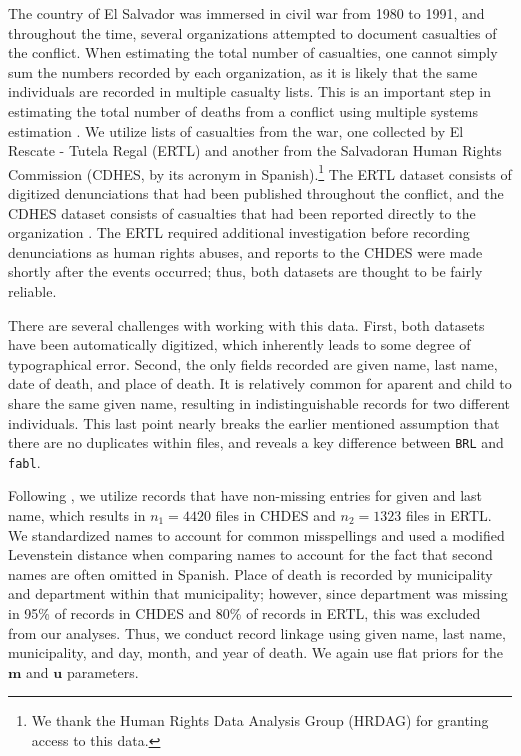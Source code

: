 \documentclass[ba]{imsart}
\begin{document}
The country of El Salvador was immersed in civil war from 1980 to 1991, and throughout the time, several organizations attempted to document casualties of the conflict. When estimating the total number of casualties, one cannot simply sum the numbers recorded by each organization, as it is likely that the same individuals are recorded in multiple casualty lists. This is an important step in estimating the total number of deaths from a conflict using multiple systems estimation \citep{lum2013applications}. We utilize lists of casualties from the war, one collected by El Rescate - Tutela Regal (ERTL) and another from the Salvadoran Human Rights Commission (CDHES, by its acronym in Spanish).\footnote{We thank the Human Rights Data Analysis Group (HRDAG) for granting access to this data.} The ERTL dataset consists of digitized denunciations that had been published throughout the conflict, and the CDHES dataset consists of casualties that had been reported directly to the organization \citep{howland2008rescate, ball2000salvadoran}. The ERTL required additional investigation before recording denunciations as human rights abuses, and reports to the CHDES were made shortly after the events occurred; thus, both datasets are thought to be fairly reliable.

There are several challenges with working with this data. First, both datasets have been automatically digitized, which inherently leads to some degree of typographical error. Second, the only fields recorded are given name, last name, date of death, and place of death. It is relatively common for aparent and child to share the same given name, resulting in indistinguishable records for two different individuals. This last point nearly breaks the earlier mentioned assumption that there are no duplicates within files, and reveals a key difference between
\texttt{BRL} and \texttt{fabl}.

Following \cite{sadinle_bayesian_2017}, we utilize records that have non-missing entries for given and last name, which results in \(n_1 = 4420\) files in CHDES and \(n_2 = 1323\) files in ERTL. We standardized names to account for common misspellings and used a modified Levenstein distance when comparing names to account for the fact that second names are often omitted in Spanish. Place of death is recorded by municipality and department within that municipality; however, since department was missing in 95\% of records in CHDES and 80\% of records in ERTL, this was excluded from our analyses. Thus, we conduct record linkage using given name, last name, municipality, and day, month, and year of death. We again use flat priors for the \(\bm{m}\) and \(\bm{u}\) parameters.
\end{document}
